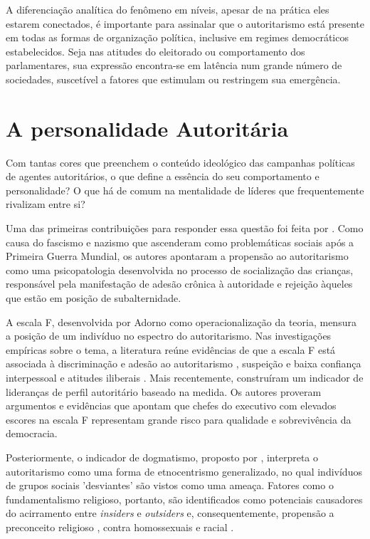 \documentclass[
12pt,				%
openright,			%
twoside,			%
a4paper,			%
english,			%
french,				%
spanish,			%
brazil				%
]{abntex2}
\begin{document}
A diferenciação analítica do fenômeno em níveis, apesar de na prática eles estarem conectados, é importante para assinalar que o autoritarismo está presente em todas as formas de organização política, inclusive em regimes democráticos estabelecidos. Seja nas atitudes do eleitorado ou comportamento dos parlamentares, sua expressão encontra-se em latência num grande número de sociedades, suscetível a fatores que estimulam ou restringem sua emergência. 

\section{A personalidade Autoritária}

Com tantas cores que preenchem o conteúdo ideológico das campanhas políticas de agentes autoritários, o que define a essência do seu comportamento e personalidade? O que há de comum na mentalidade de líderes que frequentemente rivalizam entre si?

Uma das primeiras contribuições para responder essa questão foi feita por . Como causa do fascismo e nazismo que ascenderam como problemáticas sociais após a Primeira Guerra Mundial, os autores apontaram a propensão ao autoritarismo como uma psicopatologia desenvolvida no processo de socialização das crianças, responsável pela manifestação de adesão crônica à autoridade e rejeição àqueles que estão em posição de subalternidade. 

A escala F, desenvolvida por Adorno como operacionalização da teoria, mensura a posição de um indivíduo no espectro do autoritarismo. Nas investigações empíricas sobre o tema, a literatura reúne evidências de que a escala F está associada à discriminação e adesão ao autoritarismo \cite{titus1957california, meloen1993f}, suspeição e baixa confiança interpessoal \cite{deutsch1960trust} e atitudes iliberais \cite{meloen1993f}. Mais recentemente,  construíram um indicador de lideranças de perfil autoritário baseado na medida. Os autores proveram argumentos e evidências que apontam que chefes do executivo com elevados escores na escala F representam grande risco para qualidade e sobrevivência da democracia.

Posteriormente, o indicador de dogmatismo, proposto por , interpreta o autoritarismo como uma forma de etnocentrismo generalizado, no qual indivíduos de grupos sociais 'desviantes' são vistos como uma ameaça. Fatores como o fundamentalismo religioso, portanto, são identificados como potenciais causadores do acirramento entre \emph{insiders} e \emph{outsiders} e, consequentemente, propensão a preconceito religioso \cite{laythe2001predicting}, contra homossexuais \cite{hunsberger1996religious, jonathan2008influence} e racial \cite{rowatt2004christian}.
\end{document}
